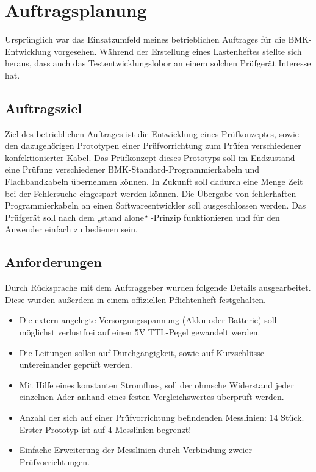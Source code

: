 \section{Auftragsplanung}


\begin{center}
Ursprünglich war das Einsatzumfeld meines betrieblichen Auftrages für die BMK-Entwicklung vorgesehen. Während der Erstellung eines Lastenheftes stellte sich heraus, dass auch das Testentwicklungslobor an einem solchen Prüfgerät Interesse hat. 
\end{center}


\subsection{Auftragsziel}

Ziel des betrieblichen Auftrages ist die Entwicklung eines Prüfkonzeptes, sowie den dazugehörigen Prototypen einer Prüfvorrichtung zum Prüfen verschiedener konfektionierter Kabel. Das Prüfkonzept dieses Prototyps soll im Endzustand eine Prüfung verschiedener BMK-Standard-Programmierkabeln und Flachbandkabeln übernehmen können. 
In Zukunft soll dadurch eine Menge Zeit bei der Fehlersuche eingespart werden können. Die Übergabe von fehlerhaften Programmierkabeln an einen Softwareentwickler soll ausgeschlossen werden.
Das Prüfgerät soll nach dem „stand alone“ -Prinzip funktionieren und für den Anwender einfach zu bedienen sein.


\subsection{Anforderungen}

Durch Rücksprache mit dem Auftraggeber wurden folgende Details ausgearbeitet. Diese wurden außerdem in einem offiziellen Pflichtenheft festgehalten. 

\begin{itemize}
	\item{Die extern angelegte Versorgungsspannung (Akku oder Batterie) soll möglichst verlustfrei auf einen 5V TTL-Pegel gewandelt werden. }

	\item{Die Leitungen sollen auf Durchgängigkeit, sowie auf Kurzschlüsse untereinander geprüft werden.}
	
	\item{Mit Hilfe eines konstanten Stromfluss, soll der ohmsche Widerstand jeder einzelnen Ader anhand eines festen Vergleichswertes überprüft werden.}
	
	\item{Anzahl der sich auf einer Prüfvorrichtung befindenden Messlinien: 14 Stück.
Erster Prototyp ist auf 4 Messlinien begrenzt!}

	\item{Einfache Erweiterung der Messlinien durch Verbindung zweier Prüfvorrichtungen.}
\end{itemize}


